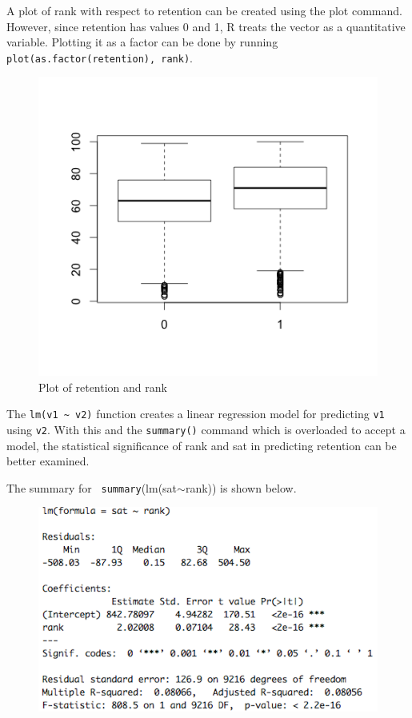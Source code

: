 \documentclass{article}
\begin{document}
A plot of rank with respect to retention can be created using the plot command. 
However, since retention has values 0 and 1, R treats the vector as a quantitative variable. 
Plotting it as a factor can be done by running \verb|plot(as.factor(retention), rank)|.

\begin{figure}[H]
\begin{center}
\includegraphics[scale=0.5]{Rplot03}
\end{center}
\caption{Plot of retention and rank}
\end{figure}

The \verb|lm(v1 ~ v2)| function creates a linear regression model for predicting \verb|v1| using \verb|v2|.
With this and the \verb|summary()| command which is overloaded to accept a model, the statistical significance of 
rank and sat in predicting retention can be better examined. 

The summary for \verb| summary|(lm(sat$\sim$rank)) is shown below. 
\begin{figure}[H]
\begin{center}
\includegraphics[scale=0.4]{ranksatlm}
\end{center}
\end{figure}
\end{document}
